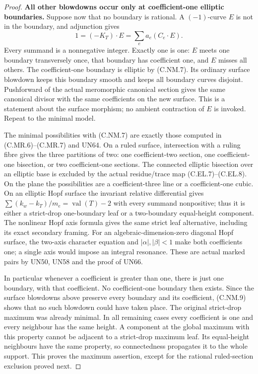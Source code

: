 \begin{proof}
\par\medskip\noindent\textbf{All other blowdowns occur only at coefficient-one elliptic boundaries.}
Suppose now that no boundary is rational. A $(-1)$-curve
$E$ is not in the boundary, and adjunction gives
\[
                     1=(-K_T)\cdot E
                              =\sum_e a_e(C_e\cdot E).
\tag{C.NM.9}
\]
Every summand is a nonnegative integer. Exactly one is
one: $E$ meets one boundary transversely once, that
boundary has coefficient one, and $E$ misses all others.
The coefficient-one boundary is elliptic by (C.NM.7).
Its ordinary surface blowdown keeps this boundary smooth
and keeps all boundary curves disjoint. Pushforward of
the actual meromorphic canonical section gives the same
canonical divisor with the same coefficients on the
new surface. This is a statement about the surface
morphism; no ambient contraction of $E$ is invoked.
Repeat to the minimal model.

The minimal possibilities with (C.NM.7) are exactly those
computed in (C.MR.6)--(C.MR.7) and UN64. On a ruled
surface, intersection with a ruling fibre gives the three
partitions of two: one coefficient-two section, one
coefficient-one bisection, or two coefficient-one sections.
The connected elliptic bisection over an elliptic base is
excluded by the actual residue/trace map (C.EL.7)--(C.EL.8).
On the plane the possibilities are a coefficient-three
line or a coefficient-one cubic. On an elliptic Hopf
surface the invariant relative differential gives
$\sum (k_w-k_T)/m_e=\operatorname{val}(T)-2$ with every
summand nonpositive; thus it is either a strict-drop
one-boundary leaf or a two-boundary equal-height component.
The nonlinear Hopf axis formula gives the same strict
leaf alternative, including its exact secondary framing.
For an algebraic-dimension-zero diagonal Hopf surface,
the two-axis character equation and $|\alpha|,|\beta|<1$
make both coefficients one; a single axis would impose
an integral resonance. These are actual marked pairs
by UN50, UN58 and the proof of UN66.

In particular whenever a coefficient is greater than
one, there is just one boundary, with that coefficient.
No coefficient-one boundary then exists. Since the
surface blowdowns above preserve every boundary and
its coefficient, (C.NM.9) shows that no such blowdown
could have taken place. The original strict-drop maximum
was already minimal. In all remaining cases every
coefficient is one and every neighbour has the same
height. A component at the global maximum with this
property cannot be adjacent to a strict-drop maximum
leaf. Its equal-height neighbours have the same property,
so connectedness propagates it to the whole support.
This proves the maximum assertion, except for the
rational ruled-section exclusion proved next.


\end{proof}
